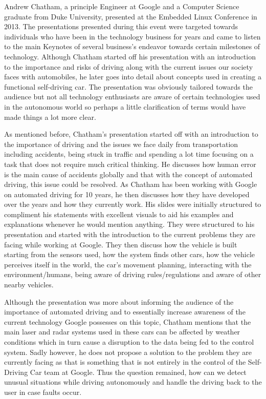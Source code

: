 \documentclass[12pt]{article}
\begin{document}
    Andrew Chatham, a principle Engineer at Google and a Computer Science graduate from Duke University, presented at the Embedded Linux Conference in 2013. The presentations presented during this event were targeted towards individuals who have been in the technology business for years and came to listen to the main Keynotes of several business's endeavor towards certain milestones of technology. Although Chatham started off his presentation with an introduction to the importance and risks of driving along with the current issues our society faces with automobiles, he later goes into detail about concepts used in creating a functional self-driving car. The presentation was obviously tailored towards the audience but not all technology enthusiasts are aware of certain technologies used in the autonomous world so perhaps a little clarification of terms would have made things a lot more clear.
    
\vspace{2.5mm} %

    As mentioned before, Chatham's presentation started off with an introduction to the importance of driving and the issues we face daily from transportation including accidents, being stuck in traffic and spending a lot time focusing on a task that does not require much critical thinking. He discusses how human error is the main cause of accidents globally and that with the concept of automated driving, this issue could be resolved. As Chatham has been working with Google on automated driving for 10 years, he then discusses how they have developed over the years and how they currently work. His slides were initially structured to compliment his statements with excellent visuals to aid his examples and explanations whenever he would mention anything. They were structured to his presentation and started with the introduction to the current problems they are facing while working at Google. They then discuss how the vehicle is built starting from the sensors used, how the system finds other cars, how the vehicle perceives itself in the world, the car's movement planning, interacting with the environment/humans, being aware of driving rules/regulations and aware of other nearby vehicles.

\vspace{2.5mm} %

    Although the presentation was more about informing the audience of the importance of automated driving and to essentially increase awareness of the current technology Google possesses on this topic, Chatham mentions that the main laser and radar systems used in these cars can be affected by weather conditions which in turn cause a disruption to the data being fed to the control system. Sadly however, he does not propose a solution to the problem they are currently facing as that is something that is not entirely in the control of the Self-Driving Car team at Google. Thus the question remained, how can we detect unusual situations while driving autonomously and handle the driving back to the user in case faults occur.
 
\end{document}

